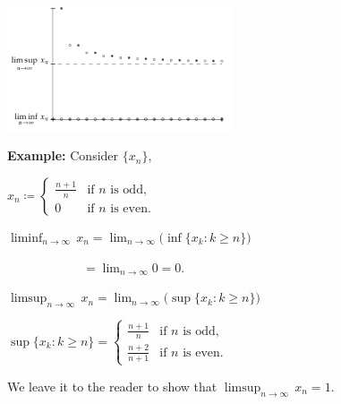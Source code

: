 \documentclass[10pt,aspectratio=149]{beamer}
\begin{document}
\begin{frame}

\hspace*{2.3in}\includegraphics[width=2.6in]{../figures/sequence-limsupliminf_an_bn-example}

\vspace*{-1.5in}

\textbf{Example:}
Consider $\{ x_n \}$,

\medskip

$\displaystyle
x_n \coloneqq
\begin{cases}
\frac{n+1}{n} & \text{if } n \text{ is odd,} \\
0             & \text{if } n \text{ is even.}
\end{cases}
$

\pause
\medskip

$\displaystyle
\liminf_{n\to\infty} \, x_n = 
\lim_{n\to\infty}
\bigl(
\inf \{ x_k : k \geq n \}
\bigr)
$

\pause
\medskip

$\displaystyle
\qquad
\qquad
\qquad
=
\lim_{n\to\infty} 0 = 0$.

\pause
\medskip

$\displaystyle
\limsup_{n\to\infty} \, x_n = 
\lim_{n\to\infty}
\bigl(
\sup \{ x_k : k \geq n \}
\bigr)$


\pause
\medskip

$\displaystyle
\sup \{ x_k : k \geq n \} =
\begin{cases}
\frac{n+1}{n}   & \text{if } n \text{ is odd,} \\
\frac{n+2}{n+1} & \text{if } n \text{ is even.}
\end{cases}$

\pause
\medskip

We leave it to the reader to show that $\displaystyle \limsup_{n\to\infty} \, x_n = 1$.

\end{frame}
\end{document}
